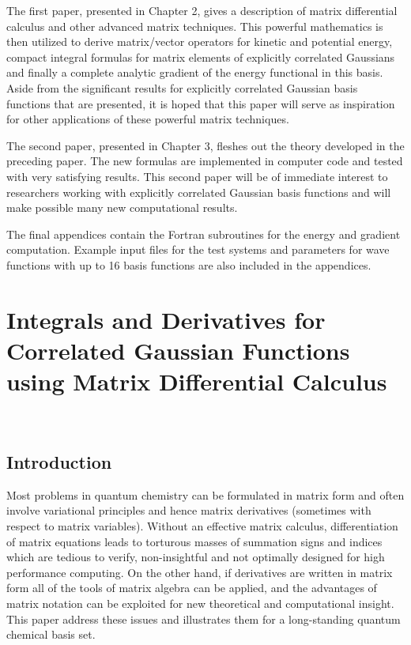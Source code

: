 \documentclass[12pt,thmsa,suthesis,verbatim]{report}
\begin{document}
The first paper\cite{Kinghorn95a}, presented in Chapter 2, gives a
description of matrix differential calculus and other advanced matrix
techniques. This powerful mathematics is then utilized to derive
matrix/vector operators for kinetic and potential energy, compact integral
formulas for matrix elements of explicitly correlated Gaussians and finally
a complete analytic gradient of the energy functional in this basis. Aside
from the significant results for explicitly correlated Gaussian basis
functions that are presented, it is hoped that this paper will serve as
inspiration for other applications of these powerful matrix techniques.

The second paper\cite{Kinghorn95b}, presented in Chapter 3, fleshes out the
theory developed in the preceding paper. The new formulas are implemented in
computer code and tested with very satisfying results. This second paper
will be of immediate interest to researchers working with explicitly
correlated Gaussian basis functions and will make possible many new
computational results.

The final appendices contain the Fortran subroutines for the energy and
gradient computation. Example input files for the test systems and
parameters for wave functions with up to 16 basis functions are also
included in the appendices.

\chapter{Integrals and Derivatives for Correlated Gaussian Functions using
Matrix Differential Calculus}

\newpage\ 

\section{Introduction}

Most problems in quantum chemistry can be formulated in matrix form and
often involve variational principles and hence matrix derivatives (sometimes
with respect to matrix variables). Without an effective matrix calculus,
differentiation of matrix equations leads to torturous masses of summation
signs and indices which are tedious to verify, non-insightful and not
optimally designed for high performance computing. On the other hand, if
derivatives are written in matrix form all of the tools of matrix algebra
can be applied, and the advantages of matrix notation can be exploited for
new theoretical and computational insight. This paper address these issues
and illustrates them for a long-standing quantum chemical basis set.
\end{document}
